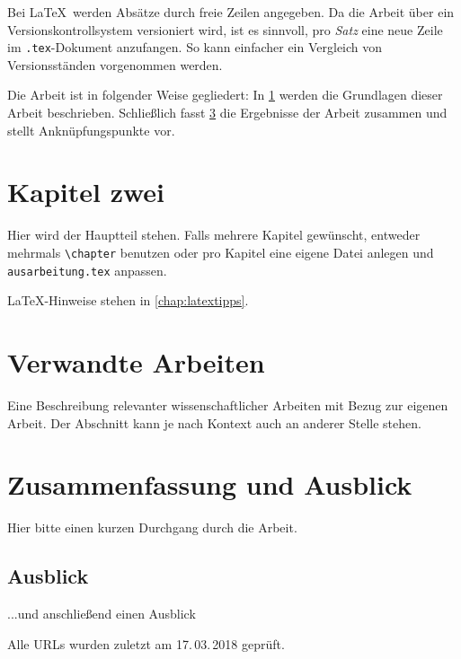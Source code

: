 \documentclass[
  ngerman,
  a4paper,  %
  twoside,  %
  bibliography=totoc,
  headsepline,
  cleardoublepage=empty,
  parskip=half,
  draft=false
]{scrbook}
\begin{document}
Bei \LaTeX\ werden Absätze durch freie Zeilen angegeben.
Da die Arbeit über ein Versionskontrollsystem versioniert wird, ist es sinnvoll, pro \emph{Satz} eine neue Zeile im \texttt{.tex}-Dokument anzufangen.
So kann einfacher ein Vergleich von Versionsständen vorgenommen werden.

Die Arbeit ist in folgender Weise gegliedert:
In \cref{chap:k2} werden die Grundlagen dieser Arbeit beschrieben.
Schließlich fasst \cref{chap:zusfas} die Ergebnisse der Arbeit zusammen und stellt Anknüpfungspunkte vor.


\chapter{Kapitel zwei}
\label{chap:k2}

Hier wird der Hauptteil stehen.
Falls mehrere Kapitel gewünscht, entweder mehrmals \texttt{\textbackslash{}chapter} benutzen oder pro Kapitel eine eigene Datei anlegen und \texttt{ausarbeitung.tex} anpassen.

LaTeX-Hinweise stehen in \cref{chap:latextipps}.

\blinddocument

\chapter{Verwandte Arbeiten}
Eine Beschreibung relevanter wissenschaftlicher Arbeiten mit Bezug zur eigenen Arbeit. Der Abschnitt kann je nach Kontext auch an anderer Stelle stehen.

\chapter{Zusammenfassung und Ausblick}\label{chap:zusfas}
Hier bitte einen kurzen Durchgang durch die Arbeit.

\section*{Ausblick}
...und anschließend einen Ausblick

\printbibliography

Alle URLs wurden zuletzt am 17.\,03.\,2018 geprüft.

\appendix


\pagestyle{empty}
\renewcommand*{\chapterpagestyle}{empty}
\Versicherung
\end{document}

